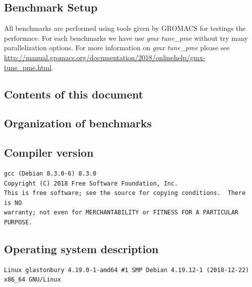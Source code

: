 	\subsection{Benchmark Setup}
	
	All benchmarks are performed using tools given by GROMACS for testings the performace. For each benchmarks we have use \textit{gmx tune\_pme} without try many parallelization options. For more information on \textit{gmx tune\_pme} please see \href{http://manual.gromacs.org/documentation/2018/onlinehelp/gmx-tune\_pme.html}{http://manual.gromacs.org/documentation/2018/onlinehelp/gmx-tune\_pme.html}.
	
	\subsection{Contents of this document}
	
	\subsection{Organization of benchmarks}
	
	\subsection{Compiler version}
	\begin{lstlisting}[frame=single]
gcc (Debian 8.3.0-6) 8.3.0
Copyright (C) 2018 Free Software Foundation, Inc.
This is free software; see the source for copying conditions.  There is NO
warranty; not even for MERCHANTABILITY or FITNESS FOR A PARTICULAR PURPOSE.
\end{lstlisting}
	
	\subsection{Operating system description}
\begin{lstlisting}[frame=single]
Linux glastonbury 4.19.0-1-amd64 #1 SMP Debian 4.19.12-1 (2018-12-22) x86_64 GNU/Linux
\end{lstlisting}
